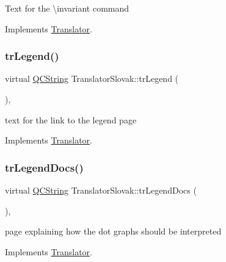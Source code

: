 Text for the \textbackslash{}invariant command 

Implements \mbox{\hyperlink{class_translator}{Translator}}.

\mbox{\label{class_translator_slovak_a8558e6cdf97270553b145d6f670b3a5c}} 
\subsubsection{\texorpdfstring{trLegend()}{trLegend()}}
{\footnotesize\ttfamily virtual \mbox{\hyperlink{class_q_c_string}{Q\+C\+String}} Translator\+Slovak\+::tr\+Legend (\begin{DoxyParamCaption}{ }\end{DoxyParamCaption})\hspace{0.3cm}{\ttfamily [inline]}, {\ttfamily [virtual]}}

text for the link to the legend page 

Implements \mbox{\hyperlink{class_translator}{Translator}}.

\mbox{\label{class_translator_slovak_a2e72a584805c659f9401ab89993dc5c2}} 
\subsubsection{\texorpdfstring{trLegendDocs()}{trLegendDocs()}}
{\footnotesize\ttfamily virtual \mbox{\hyperlink{class_q_c_string}{Q\+C\+String}} Translator\+Slovak\+::tr\+Legend\+Docs (\begin{DoxyParamCaption}{ }\end{DoxyParamCaption})\hspace{0.3cm}{\ttfamily [inline]}, {\ttfamily [virtual]}}

page explaining how the dot graph\textquotesingle{}s should be interpreted 

Implements \mbox{\hyperlink{class_translator}{Translator}}.

\mbox{\label{class_translator_slovak_aba3a8f204ad57b1baac2bdc6af7b4201}} 
